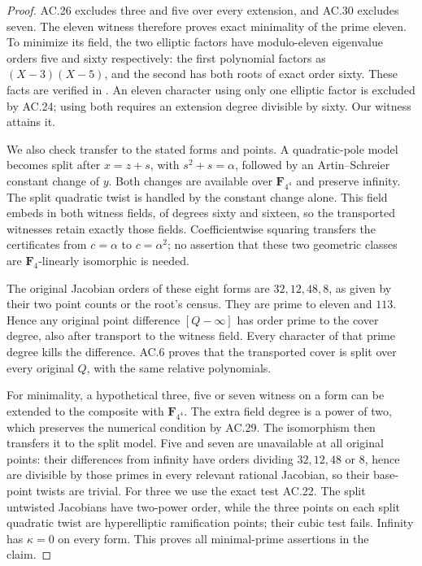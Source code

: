 \begin{proof}
AC.26 excludes three and five over every extension, and AC.30
excludes seven. The eleven witness therefore proves exact minimality
of the prime eleven. To minimize its field, the two elliptic factors
have modulo-eleven eigenvalue orders five and sixty respectively:
the first polynomial factors as $(X-3)(X-5)$, and the second has
both roots of exact order sixty. These facts are verified in
.
An eleven character using only one elliptic factor is excluded by
AC.24; using both requires an extension degree divisible by sixty.
Our witness attains it.

We also check transfer to the stated forms and points.
A quadratic-pole model becomes split after $x=z+s$, with
$s^2+s=\alpha$, followed by an Artin--Schreier constant change of
$y$. Both changes are available over $\mathbf F_{4^4}$ and preserve
infinity. The split quadratic twist is handled by the constant
change alone. This field embeds in both witness fields, of degrees
sixty and sixteen, so the transported witnesses retain exactly
those fields. Coefficientwise squaring transfers the certificates
from $c=\alpha$ to $c=\alpha^2$; no assertion that these two
geometric classes are $\mathbf F_4$-linearly isomorphic is needed.

The original Jacobian orders of these eight forms are $32,12,48,8$,
as given by their two point counts or the root's census. They are
prime to eleven and $113$. Hence any original point difference
$[Q-\infty]$ has order prime to the cover degree, also after transport
to the witness field. Every character of that prime degree kills
the difference. AC.6 proves that the transported cover is split
over every original $Q$, with the same relative polynomials.

For minimality, a hypothetical three, five or seven witness on a
form can be extended to the composite with $\mathbf F_{4^4}$.
The extra field degree is a power of two, which preserves the
numerical condition by AC.29. The isomorphism then transfers it
to the split model. Five and seven are unavailable at all original
points: their differences from infinity have orders dividing
$32,12,48$ or $8$, hence are divisible by those primes in every
relevant rational Jacobian, so their base-point twists are trivial.
For three we use the exact test AC.22. The split untwisted
Jacobians have two-power order, while the three points on each
split quadratic twist are hyperelliptic ramification points;
their cubic test fails. Infinity has $\kappa=0$ on every form.
This proves all minimal-prime assertions in the claim.
\end{proof}

